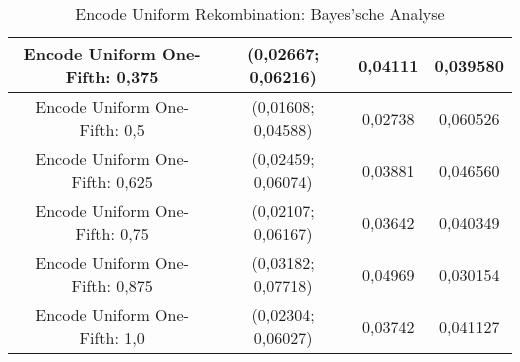 \begin{table}[H]
\begin{tabular}{c | c | c | c}
		\hline
		Encode Uniform One-Fifth: 0,375 & (0,02667; 0,06216) & 0,04111 & 0,039580\\
		\hline
		Encode Uniform One-Fifth: 0,5 & \color{Green}(0,01608; 0,04588)\color{black} & \color{Green}0,02738\color{black} & \color{Green}0,060526\color{black}\\
		\hline
		Encode Uniform One-Fifth: 0,625 & (0,02459; 0,06074) & 0,03881 & 0,046560\\
		\hline
		Encode Uniform One-Fifth: 0,75 & (0,02107; 0,06167) & 0,03642 & 0,040349\\
		\hline
		Encode Uniform One-Fifth: 0,875 & \color{red}(0,03182; 0,07718)\color{black} &\color{red} 0,04969\color{black} & \color{red}0,030154\color{black}\\
		\hline
		Encode Uniform One-Fifth: 1,0 & (0,02304; 0,06027) & 0,03742 & 0,041127\\
	\end{tabular}
	\caption{Encode Uniform Rekombination: Bayes'sche Analyse}
	\label{table:encodeUniformBayesian}
\end{table}
